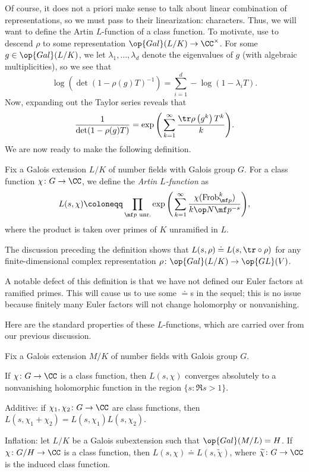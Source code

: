 \documentclass[../thesis.tex]{subfiles}
\begin{document}
Of course, it does not a priori make sense to talk about linear combination of representations, so we must pass to their linearization: characters. Thus, we will want to define the Artin $L$-function of a class function. To motivate, use  to descend $\rho$ to some representation $\op{Gal}(L/K)\to\CC^\times$. For some $g\in\op{Gal}(L/K)$, we let $\lambda_1,\ldots,\lambda_d$ denote the eigenvalues of $g$ (with algebraic multiplicities), so we see that
\[\log\left(\det(1-\rho(g)T)^{-1}\right)=\sum_{i=1}^d-\log(1-\lambda_iT).\]
Now, expanding out the Taylor series reveals that
\[\frac1{\det(1-\rho(g)T)}=\exp\Bigg(\sum_{k=1}^\infty\frac{\tr\rho\left(g^k\right)T^k}k\Bigg).\]
We are now ready to make the following definition.
\begin{defihelper} 
	Fix a Galois extension $L/K$ of number fields with Galois group $G$. For a class function $\chi\colon G\to\CC$, we define the \textit{Artin $L$-function} as
	\[L(s,\chi)\coloneqq\prod_{\mf p\text{ unr.}}\exp\Bigg(\sum_{k=1}^\infty\frac{\chi(\mathrm{Frob}_{\mf p}^k)}{k\op N\mf p^{-s}}\Bigg),\]
	where the product is taken over primes of $K$ unramified in $L$.
\end{defihelper}
\begin{example} \label{ex:artin-l-func-rep-to-char}
	The discussion preceding the definition shows that $L(s,\rho)\doteq L(s,{\tr}\circ\rho)$ for any finite-dimensional complex representation $\rho\colon\op{Gal}(L/K)\to\op{GL}(V)$.
\end{example}
\begin{remark}
	A notable defect of this definition is that we have not defined our Euler factors at ramified primes. This will cause us to use some $\doteq$s in the sequel; this is no issue because finitely many Euler factors will not change holomorphy or nonvanishing.
\end{remark}
Here are the standard properties of these $L$-functions, which are carried over from our previous discussion.
\begin{lemma} \label{lem:artin-class-basic}
	Fix a Galois extension $M/K$ of number fields with Galois group $G$.
	\begin{listalph}
		\item If $\chi\colon G\to\CC$ is a class function, then $L(s,\chi)$ converges absolutely to a nonvanishing holomorphic function in the region $\{s:\Re s>1\}$.
		\item Additive: if $\chi_1,\chi_2\colon G\to\CC$ are class functions, then $L(s,\chi_1+\chi_2)=L(s,\chi_1)L(s,\chi_2)$.
		\item Inflation: let $L/K$ be a Galois subextension such that $\op{Gal}(M/L)=H$. If $\chi\colon G/H\to\CC$ is a class function, then $L(s,\chi)\doteq L(s,\widetilde\chi)$, where $\widetilde\chi\colon G\to\CC$ is the induced class function.
	\end{listalph}
\end{lemma}
\end{document}
